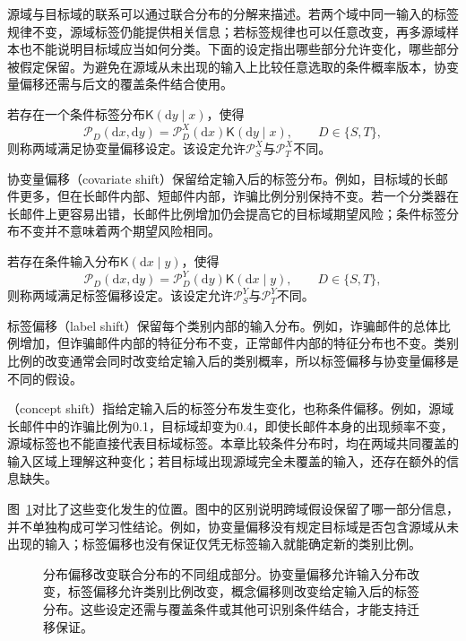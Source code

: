 源域与目标域的联系可以通过联合分布的分解来描述。若两个域中同一输入的标签规律不变，源域标签仍能提供相关信息；若标签规律也可以任意改变，再多源域样本也不能说明目标域应当如何分类。下面的设定指出哪些部分允许变化，哪些部分被假定保留。为避免在源域从未出现的输入上比较任意选取的条件概率版本，协变量偏移还需与后文的覆盖条件结合使用。

\begin{definition}[协变量偏移]
\label{def:covariate-shift}
若存在一个条件标签分布$\mathsf K(\mathrm dy\mid x)$，使得
\[
 \mathcal P_D(\mathrm dx,\mathrm dy)
 =\mathcal P_D^X(\mathrm dx)\mathsf K(\mathrm dy\mid x),
 \qquad D\in\{S,T\},
\]
则称两域满足协变量偏移设定。该设定允许$\mathcal P_S^X$与$\mathcal P_T^X$不同。
\end{definition}

协变量偏移（covariate shift）保留给定输入后的标签分布。例如，目标域的长邮件更多，但在长邮件内部、短邮件内部，诈骗比例分别保持不变。若一个分类器在长邮件上更容易出错，长邮件比例增加仍会提高它的目标域期望风险；条件标签分布不变并不意味着两个期望风险相同。

\begin{definition}[标签偏移]
\label{def:label-shift}
若存在条件输入分布$\mathsf K(\mathrm dx\mid y)$，使得
\[
 \mathcal P_D(\mathrm dx,\mathrm dy)
 =\mathcal P_D^Y(\mathrm dy)\mathsf K(\mathrm dx\mid y),
 \qquad D\in\{S,T\},
\]
则称两域满足标签偏移设定。该设定允许$\mathcal P_S^Y$与$\mathcal P_T^Y$不同。
\end{definition}

标签偏移（label shift）保留每个类别内部的输入分布。例如，诈骗邮件的总体比例增加，但诈骗邮件内部的特征分布不变，正常邮件内部的特征分布也不变。类别比例的改变通常会同时改变给定输入后的类别概率，所以标签偏移与协变量偏移是不同的假设。

（concept shift）指给定输入后的标签分布发生变化，也称条件偏移。例如，源域长邮件中的诈骗比例为0.1，目标域却变为0.4，即使长邮件本身的出现频率不变，源域标签也不能直接代表目标域标签。本章比较条件分布时，均在两域共同覆盖的输入区域上理解这种变化；若目标域出现源域完全未覆盖的输入，还存在额外的信息缺失。

图~\ref{fig:learning-distribution-shift}对比了这些变化发生的位置。图中的区别说明跨域假设保留了哪一部分信息，并不单独构成可学习性结论。例如，协变量偏移没有规定目标域是否包含源域从未出现的输入；标签偏移也没有保证仅凭无标签输入就能确定新的类别比例。
\begin{figure}[htbp]
 \centering
 
 \caption{分布偏移改变联合分布的不同组成部分。协变量偏移允许输入分布改变，标签偏移允许类别比例改变，概念偏移则改变给定输入后的标签分布。这些设定还需与覆盖条件或其他可识别条件结合，才能支持迁移保证。}
 \label{fig:learning-distribution-shift}
\end{figure}

